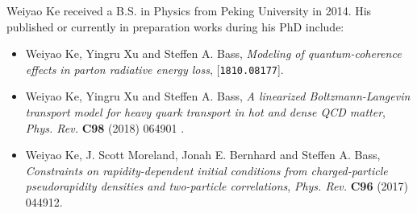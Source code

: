 \documentclass[PhD]{dukethesis2006}
\begin{document}
\doublespacing









\nocite{*}
\singlespacing

\begingroup
    \setlength{\bibsep}{10pt}
    
\endgroup


\biography
\doublespacing
Weiyao Ke received a B.S. in Physics from Peking University in 2014. His published or currently in preparation works during his PhD include:

\begin{itemize}
\singlespacing
\item Weiyao Ke, Yingru Xu and Steffen A. Bass, {\it Modeling of quantum-coherence effects in parton radiative energy loss}, [{\tt 1810.08177}].
\item Weiyao Ke, Yingru Xu and Steffen A. Bass, {\it A linearized Boltzmann-Langevin transport model for heavy quark transport in hot and dense QCD matter}, {\it Phys. Rev.} {\bf C98} (2018) 064901 .
\item Weiyao Ke, J. Scott Moreland, Jonah E. Bernhard and Steffen A. Bass, {\it Constraints on rapidity-dependent initial conditions from charged-particle pseudorapidity densities and two-particle correlations}, {\it Phys. Rev.} {\bf C96} (2017) 044912.
\end{itemize}
\end{document}

